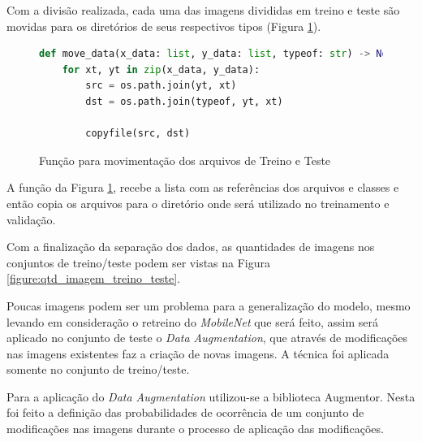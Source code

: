 
\par Com a divisão realizada, cada uma das imagens divididas em treino e teste são movidas para os diretórios de seus respectivos tipos (Figura \ref{figure:move_splitted_data}).

\begin{figure}[H]
    \centering
    \begin{lstlisting}[language=Python]
def move_data(x_data: list, y_data: list, typeof: str) -> None:
    for xt, yt in zip(x_data, y_data):
        src = os.path.join(yt, xt)
        dst = os.path.join(typeof, yt, xt)
        
        copyfile(src, dst)
\end{lstlisting}
    \caption{Função para movimentação dos arquivos de Treino e Teste}
    \label{figure:move_splitted_data}
\end{figure}

\par A função da Figura \ref{figure:move_splitted_data}, recebe a lista com as referências dos arquivos e classes e então copia os arquivos para o diretório onde será utilizado no treinamento e validação.

\par Com a finalização da separação dos dados, as quantidades de imagens nos conjuntos de treino/teste podem ser vistas na Figura \ref{figure:qtd_imagem_treino_teste}.


\par Poucas imagens podem ser um problema para a generalização do modelo, mesmo levando em consideração o retreino do \textit{MobileNet} que será feito, assim será aplicado no conjunto de teste o \textit{Data Augmentation}, que através de modificações nas imagens existentes faz a criação de novas imagens. A técnica foi aplicada somente no conjunto de treino/teste.

\par Para a aplicação do \textit{Data Augmentation} utilizou-se a biblioteca Augmentor. Nesta foi feito a definição das probabilidades de ocorrência de um conjunto de modificações nas imagens durante o processo de aplicação das modificações.

